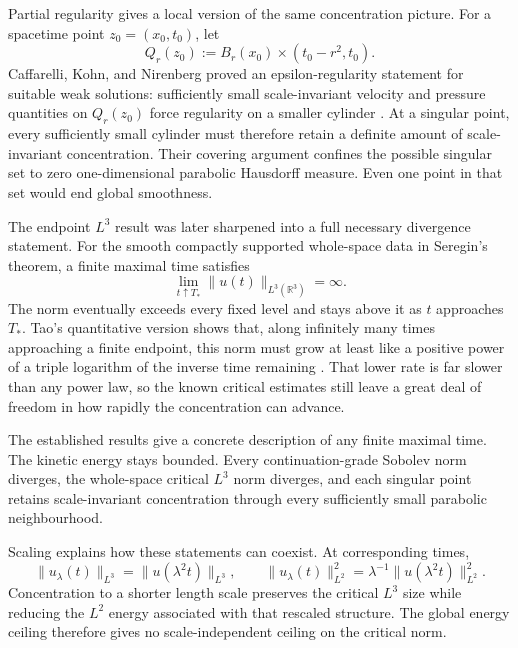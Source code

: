 Partial regularity gives a local version of the same concentration picture.
For a spacetime point \(z_0=(x_0,t_0)\), let
\[
  Q_r(z_0)
  :=
  B_r(x_0)\times(t_0-r^2,t_0).
\]
Caffarelli, Kohn, and Nirenberg proved an epsilon-regularity statement for suitable weak solutions: sufficiently small scale-invariant velocity and pressure quantities on \(Q_r(z_0)\) force regularity on a smaller cylinder \parencite{CaffarelliKohnNirenberg1982}.
At a singular point, every sufficiently small cylinder must therefore retain a definite amount of scale-invariant concentration.
Their covering argument confines the possible singular set to zero one-dimensional parabolic Hausdorff measure.
Even one point in that set would end global smoothness.

The endpoint \(L^3\) result was later sharpened into a full necessary divergence statement.
For the smooth compactly supported whole-space data in Seregin's theorem, a finite maximal time satisfies \parencite{Seregin2012}
\[
  \lim_{t\uparrow T_*}
  \lVert u(t)\rVert_{L^3(\mathbb R^3)}
  =
  \infty.
\]
The norm eventually exceeds every fixed level and stays above it as \(t\) approaches \(T_*\).
Tao's quantitative version shows that, along infinitely many times approaching a finite endpoint, this norm must grow at least like a positive power of a triple logarithm of the inverse time remaining \parencite{Tao2021Quantitative}.
That lower rate is far slower than any power law, so the known critical estimates still leave a great deal of freedom in how rapidly the concentration can advance.


The established results give a concrete description of any finite maximal time.
The kinetic energy stays bounded.
Every continuation-grade Sobolev norm diverges, the whole-space critical \(L^3\) norm diverges, and each singular point retains scale-invariant concentration through every sufficiently small parabolic neighbourhood.

Scaling explains how these statements can coexist.
At corresponding times,
\[
  \lVert u_\lambda(t)\rVert_{L^3}
  =
  \lVert u(\lambda^2t)\rVert_{L^3},
  \qquad
  \lVert u_\lambda(t)\rVert_{L^2}^{2}
  =
  \lambda^{-1}
  \lVert u(\lambda^2t)\rVert_{L^2}^{2}.
\]
Concentration to a shorter length scale preserves the critical \(L^3\) size while reducing the \(L^2\) energy associated with that rescaled structure.
The global energy ceiling therefore gives no scale-independent ceiling on the critical norm.

